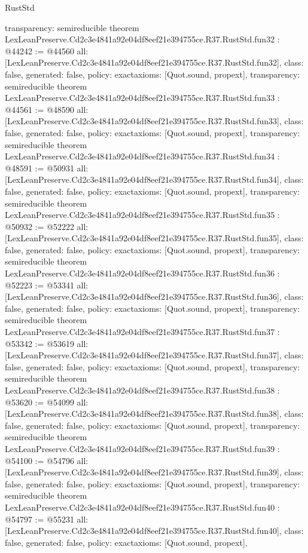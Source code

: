 \begin{lexlean}{RustStd}
\begin{coremodule}
{  transparency: semireducible
}
theorem LexLeanPreserve.Cd2c3e4841a92e04df8eef21e394755ce.R37.RustStd.fun32 : @44242 := @44560 {
  all: [LexLeanPreserve.Cd2c3e4841a92e04df8eef21e394755ce.R37.RustStd.fun32],
  class: false,
  generated: false,
  policy: exact{axioms: [Quot.sound, propext]},
  transparency: semireducible
}
theorem LexLeanPreserve.Cd2c3e4841a92e04df8eef21e394755ce.R37.RustStd.fun33 : @44561 := @48590 {
  all: [LexLeanPreserve.Cd2c3e4841a92e04df8eef21e394755ce.R37.RustStd.fun33],
  class: false,
  generated: false,
  policy: exact{axioms: [Quot.sound, propext]},
  transparency: semireducible
}
theorem LexLeanPreserve.Cd2c3e4841a92e04df8eef21e394755ce.R37.RustStd.fun34 : @48591 := @50931 {
  all: [LexLeanPreserve.Cd2c3e4841a92e04df8eef21e394755ce.R37.RustStd.fun34],
  class: false,
  generated: false,
  policy: exact{axioms: [Quot.sound, propext]},
  transparency: semireducible
}
theorem LexLeanPreserve.Cd2c3e4841a92e04df8eef21e394755ce.R37.RustStd.fun35 : @50932 := @52222 {
  all: [LexLeanPreserve.Cd2c3e4841a92e04df8eef21e394755ce.R37.RustStd.fun35],
  class: false,
  generated: false,
  policy: exact{axioms: [Quot.sound, propext]},
  transparency: semireducible
}
theorem LexLeanPreserve.Cd2c3e4841a92e04df8eef21e394755ce.R37.RustStd.fun36 : @52223 := @53341 {
  all: [LexLeanPreserve.Cd2c3e4841a92e04df8eef21e394755ce.R37.RustStd.fun36],
  class: false,
  generated: false,
  policy: exact{axioms: [Quot.sound, propext]},
  transparency: semireducible
}
theorem LexLeanPreserve.Cd2c3e4841a92e04df8eef21e394755ce.R37.RustStd.fun37 : @53342 := @53619 {
  all: [LexLeanPreserve.Cd2c3e4841a92e04df8eef21e394755ce.R37.RustStd.fun37],
  class: false,
  generated: false,
  policy: exact{axioms: [Quot.sound, propext]},
  transparency: semireducible
}
theorem LexLeanPreserve.Cd2c3e4841a92e04df8eef21e394755ce.R37.RustStd.fun38 : @53620 := @54099 {
  all: [LexLeanPreserve.Cd2c3e4841a92e04df8eef21e394755ce.R37.RustStd.fun38],
  class: false,
  generated: false,
  policy: exact{axioms: [Quot.sound, propext]},
  transparency: semireducible
}
theorem LexLeanPreserve.Cd2c3e4841a92e04df8eef21e394755ce.R37.RustStd.fun39 : @54100 := @54796 {
  all: [LexLeanPreserve.Cd2c3e4841a92e04df8eef21e394755ce.R37.RustStd.fun39],
  class: false,
  generated: false,
  policy: exact{axioms: [Quot.sound, propext]},
  transparency: semireducible
}
theorem LexLeanPreserve.Cd2c3e4841a92e04df8eef21e394755ce.R37.RustStd.fun40 : @54797 := @55231 {
  all: [LexLeanPreserve.Cd2c3e4841a92e04df8eef21e394755ce.R37.RustStd.fun40],
  class: false,
  generated: false,
  policy: exact{axioms: [Quot.sound, propext]},
}
\end{coremodule}
\end{lexlean}
